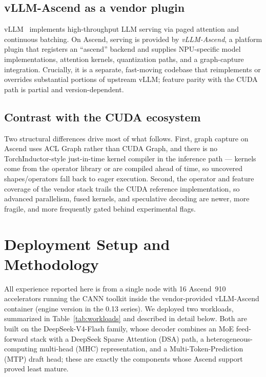 \documentclass{article}
\begin{document}
\subsection{vLLM-Ascend as a vendor plugin}
vLLM~\cite{vllm} implements high-throughput LLM serving via paged attention and
continuous batching. On Ascend, serving is provided by \emph{vLLM-Ascend}, a
platform plugin that registers an ``ascend'' backend and supplies NPU-specific
model implementations, attention kernels, quantization paths, and a graph-capture
integration. Crucially, it is a separate, fast-moving codebase that reimplements
or overrides substantial portions of upstream vLLM; feature parity with the CUDA
path is partial and version-dependent.

\subsection{Contrast with the CUDA ecosystem}
Two structural differences drive most of what follows. First, graph capture on
Ascend uses ACL Graph rather than CUDA Graph, and there is no TorchInductor-style
just-in-time kernel compiler in the inference path --- kernels come from the
operator library or are compiled ahead of time, so uncovered shapes/operators
fall back to eager execution. Second, the operator and feature coverage of the
vendor stack trails the CUDA reference implementation, so advanced parallelism,
fused kernels, and speculative decoding are newer, more fragile, and more
frequently gated behind experimental flags.

\section{Deployment Setup and Methodology}
\label{sec:setup}
All experience reported here is from a single node with 16 Ascend~910
accelerators running the CANN toolkit inside the vendor-provided vLLM-Ascend
container (engine version in the 0.13 series). We deployed two workloads,
summarized in Table~\ref{tab:workloads} and described in detail below. Both are
built on the DeepSeek-V4-Flash family, whose decoder combines an MoE feed-forward
stack with a DeepSeek Sparse Attention (DSA) path, a heterogeneous-computing
multi-head (MHC) representation, and a Multi-Token-Prediction (MTP) draft head;
these are exactly the components whose Ascend support proved least mature.
\end{document}
